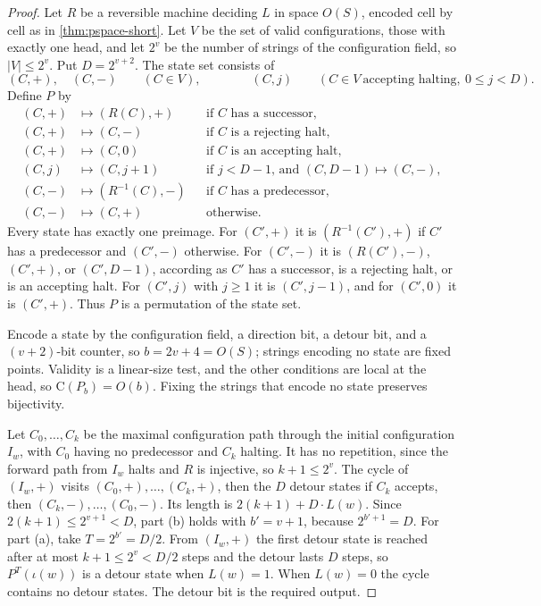 \documentclass[11pt]{article}
\theoremstyle{definition}
\theoremstyle{remark}
\newcommand{\CC}{\mathrm{C}}
\numberwithin{equation}{section}
\begin{document}
\begin{proof}
Let $R$ be a reversible machine deciding $L$ in space $O(S)$, encoded cell
by cell as in \cref{thm:pspace-short}.  Let $V$ be the set of valid
configurations, those with exactly one head, and let $2^{v}$ be the number
of strings of the configuration field, so $|V|\leq 2^{v}$.  Put
$D=2^{v+2}$.  The state set consists of
\[
 (C,+),\quad (C,-)\qquad (C\in V),
 \qquad\qquad
 (C,j)\qquad(C\in V\ \text{accepting halting},\ 0\leq j<D).
\]
Define $P$ by
\begin{align*}
 (C,+)&\mapsto(R(C),+)&&\text{if $C$ has a successor},\\
 (C,+)&\mapsto(C,-)&&\text{if $C$ is a rejecting halt},\\
 (C,+)&\mapsto(C,0)&&\text{if $C$ is an accepting halt},\\
 (C,j)&\mapsto(C,j+1)&&\text{if $j<D-1$, and $(C,D-1)\mapsto(C,-)$},\\
 (C,-)&\mapsto(R^{-1}(C),-)&&\text{if $C$ has a predecessor},\\
 (C,-)&\mapsto(C,+)&&\text{otherwise}.
\end{align*}
Every state has exactly one preimage.  For $(C',+)$ it is $(R^{-1}(C'),+)$
if $C'$ has a predecessor and $(C',-)$ otherwise.  For $(C',-)$ it is
$(R(C'),-)$, $(C',+)$, or $(C',D-1)$, according as $C'$ has a successor,
is a rejecting halt, or is an accepting halt.  For $(C',j)$ with $j\geq1$
it is $(C',j-1)$, and for $(C',0)$ it is $(C',+)$.  Thus $P$ is a
permutation of the state set.

Encode a state by the configuration field, a direction bit, a detour bit,
and a $(v+2)$-bit counter, so $b=2v+4=O(S)$; strings encoding no state
are fixed points.  Validity is a linear-size test, and the other
conditions are local at the head, so $\CC(P_b)=O(b)$.  Fixing the
strings that encode no state preserves bijectivity.

Let $C_0,\ldots,C_k$ be the maximal configuration path through the initial
configuration $I_w$, with $C_0$ having no predecessor and $C_k$ halting.
It has no repetition, since the forward path from $I_w$ halts and $R$ is
injective, so $k+1\leq 2^{v}$.  The cycle of $(I_w,+)$ visits
$(C_0,+),\ldots,(C_k,+)$, then the $D$ detour states if $C_k$ accepts,
then $(C_k,-),\ldots,(C_0,-)$.  Its length is $2(k+1)+D\cdot L(w)$.  Since
$2(k+1)\leq 2^{v+1}<D$, part (b) holds with $b'=v+1$, because
$2^{b'+1}=D$.  For part (a), take $T=2^{b'}=D/2$.  From $(I_w,+)$ the
first detour state is reached after at most $k+1\leq 2^v<D/2$ steps and
the detour lasts $D$ steps, so $P^{T}(\iota(w))$ is a detour state when
$L(w)=1$.  When $L(w)=0$ the cycle contains no detour states.  The detour
bit is the required output.


\end{proof}
\end{document}

